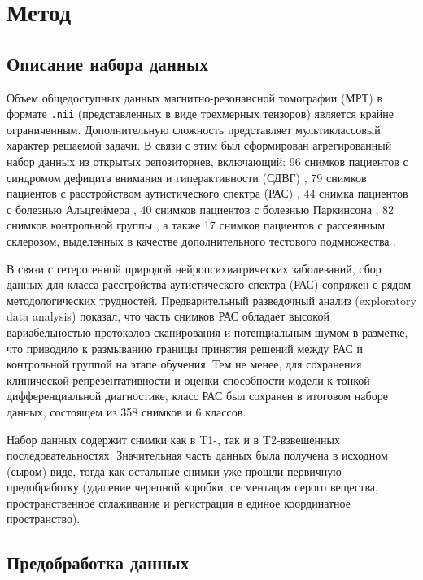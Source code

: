 \documentclass[eqsecnum, authorsinfo]{kioj6}
\begin{document}
\section{Метод}\label{sec:methodology}

\subsection{Описание набора данных}

Объем общедоступных данных магнитно-резонансной томографии (МРТ) в формате \texttt{.nii} (представленных в виде трехмерных тензоров) является крайне ограниченным. 
Дополнительную сложность представляет мультиклассовый характер решаемой задачи. В связи с этим был сформирован агрегированный набор данных 
из открытых репозиториев, включающий:
96 снимков пациентов с синдромом дефицита внимания и гиперактивности (СДВГ) \cite{adhd200}, 
79 снимков пациентов с расстройством аутистического спектра (РАС) \cite{abide}, 
44 снимка пациентов с болезнью Альцгеймера \cite{oasis}, 
40 снимков пациентов с болезнью Паркинсона \cite{ppmi}, 
82 снимков контрольной группы \cite{IXI} \cite{abide} \cite{adhd200}, 
а также 17 снимков пациентов с рассеянным склерозом, выделенных в качестве дополнительного тестового подмножества \cite{isbi-ms}.

В связи с гетерогенной природой нейропсихиатрических заболеваний, сбор данных для класса расстройства аутистического спектра (РАС) сопряжен с рядом 
методологических трудностей. Предварительный разведочный анализ (exploratory data analysis) показал, что часть снимков РАС обладает высокой вариабельностью 
протоколов сканирования и потенциальным шумом в разметке, что приводило к размыванию границы принятия решений между РАС и контрольной группой на этапе обучения. 
Тем не менее, для сохранения клинической репрезентативности и оценки способности модели к тонкой дифференциальной диагностике, класс РАС был сохранен в итоговом наборе данных, 
состоящем из 358 снимков и 6 классов.

Набор данных содержит снимки как в T1-, так и в T2-взвешенных последовательностях. Значительная часть данных была получена в исходном (сыром) виде, 
тогда как остальные снимки уже прошли первичную предобработку (удаление черепной коробки, сегментация серого вещества, пространственное сглаживание и регистрация 
в единое координатное пространство).

\subsection{Предобработка данных}
\end{document}
